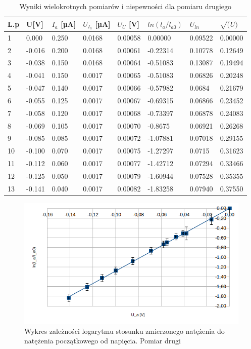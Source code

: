 \documentclass[a4paper]{article}
\begin{document}
\begin{table}[h!]
\centering
 \begin{tabular}{ | l | l | l | l | l | l | l | l | }
 \hline
L.p & U[V] & $I_{a}$ [µA] & $U_{I_{a}}$ [µA] & $U_{U}$ [V] & $ln(l_{a}/l_{a0})$ & $U_{ln}$ & $\sqrt(U)$ \\ \hline
1 & 0.000 & 0.250 & 0.0168 & 0.00058 & 0.00000 & 0.09522 & 0.00000 \\ \hline
2 & -0.016 & 0.200 & 0.0168 & 0.00061 & -0.22314 & 0.10778 & 0.12649 \\ \hline
3 & -0.038 & 0.150 & 0.0168 & 0.00064 & -0.51083 & 0.13087 & 0.19494 \\ \hline
4 & -0.041 & 0.150 & 0.0017 & 0.00065 & -0.51083 & 0.06826 & 0.20248 \\ \hline
5 & -0.047 & 0.140 & 0.0017 & 0.00066 & -0.57982 & 0.0684 & 0.21679 \\ \hline
6 & -0.055 & 0.125 & 0.0017 & 0.00067 & -0.69315 & 0.06866 & 0.23452 \\ \hline
7 & -0.058 & 0.120 & 0.0017 & 0.00068 & -0.73397 & 0.06878 & 0.24083 \\ \hline
8 & -0.069 & 0.105 & 0.0017 & 0.00070 & -0.8675 & 0.06921 & 0.26268 \\ \hline
9 & -0.085 & 0.085 & 0.0017 & 0.00072 & -1.07881 & 0.07018 & 0.29155 \\ \hline
10 & -0.100 & 0.070 & 0.0017 & 0.00075 & -1.27297 & 0.0715 & 0.31623 \\ \hline
11 & -0.112 & 0.060 & 0.0017 & 0.00077 & -1.42712 & 0.07294 & 0.33466 \\ \hline
12 & -0.125 & 0.050 & 0.0017 & 0.00079 & -1.60944 & 0.07528 & 0.35355 \\ \hline
13 & -0.141 & 0.040 & 0.0017 & 0.00082 & -1.83258 & 0.07940 & 0.37550 \\ \hline
 \end{tabular}
	\caption{Wyniki wielokrotnych pomiarów i niepewności dla pomiaru drugiego}
	\label{pomiary-2}
\end{table}

\begin{figure}[h!]
	\centering
	\includegraphics[scale=0.8]{T2_ln_U}
	\caption{Wykres zależności logarytmu stosunku zmierzonego natężenia do natężenia początkowego od napięcia. Pomiar drugi}
	\label{fig-2}
\end{figure}
\end{document}
